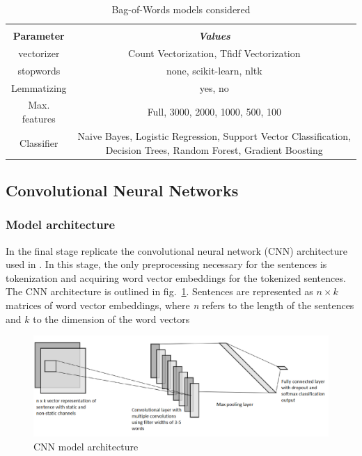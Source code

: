 \documentclass[conference]{IEEEtran}
\begin{document}
\begin{table}[htbp]
\caption{Bag-of-Words models considered}
\begin{center}
\begin{tabular}{|c|c|}
\hline
\textbf{}&\multicolumn{1}{|c|}{\textbf{}} \\ 

\textbf{Parameter} & \textbf{\textit{Values}} \\ 
\hline
vectorizer & Count Vectorization, Tfidf Vectorization \\ 
\hline
stopwords & none, scikit-learn, nltk \\ 
\hline
Lemmatizing & yes, no \\ 
\hline
Max. features & Full, 3000, 2000, 1000, 500, 100 \\ 
\hline
Classifier & Naive Bayes, Logistic Regression, Support Vector Classification, Decision Trees, Random Forest, Gradient Boosting \\ 
\hline
\end{tabular}
\label{tababw}
\end{center}
\end{table}


\subsection{Convolutional Neural Networks}

\subsubsection{Model architecture}

In the final stage replicate the convolutional neural network (CNN) architecture used in \cite{kim-2014-convolutional}. In this stage, the only preprocessing necessary for the sentences is tokenization and acquiring word vector embeddings for the tokenized sentences. The CNN architecture is outlined in fig.~\ref{fig1}. Sentences are represented as $n\times k$ matrices of word vector embeddings, where \emph{n} refers to the length of the sentences and $k$ to the dimension of the word vectors

\begin{figure}[htbp]
\centerline{\includegraphics[width = \textwidth]{fig1.png}}
\caption{CNN model architecture}
\label{fig1}
\end{figure}
\end{document}

